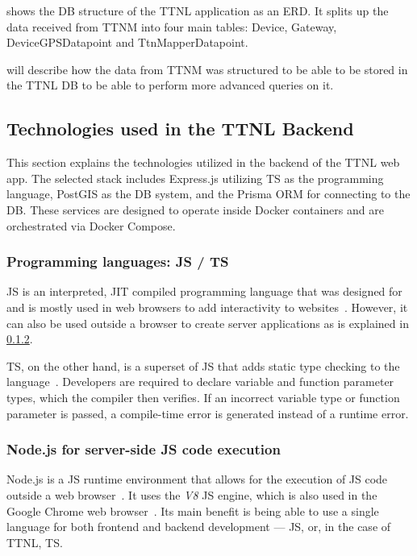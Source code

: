  shows the \ac{DB} structure of the \ac{TTNL} application as an \ac{ERD}.
It splits up the data received from \ac{TTNM} into four main tables: Device, Gateway, DeviceGPSDatapoint and TtnMapperDatapoint.

 will describe how the data from \ac{TTNM} was structured to be able to be stored in the \ac{TTNL} \ac{DB} to be able to perform more advanced queries on it.

\subsection{Technologies used in the \acl{TTNL} Backend}

This section explains the technologies utilized in the backend of the \ac{TTNL} web app.
The selected stack includes Express.js utilizing \ac{TS} as the programming language, PostGIS as the \ac{DB} system, and the Prisma \ac{ORM} for connecting to the \ac{DB}.
These services are designed to operate inside Docker containers and are orchestrated via Docker Compose.

\subsubsection{Programming languages: \acl{JS} / \acl{TS}}

\ac{JS} is an interpreted, \ac{JIT} compiled programming language that was designed for and is mostly used in web browsers to add interactivity to websites~\cite{mdn_javascript_2023}.
However, it can also be used outside a browser to create server applications as is explained in \cref{sec:nodejs}.

\ac{TS}, on the other hand, is a superset of \ac{JS} that adds static type checking to the language~\cite{microsoft_javascript_nodate}.
Developers are required to declare variable and function parameter types, which the compiler then verifies.
If an incorrect variable type or function parameter is passed, a compile-time error is generated instead of a runtime error.

\subsubsection{Node.js for server-side \acl{JS} code execution}\label{sec:nodejs}

Node.js is a \ac{JS} runtime environment that allows for the execution of \ac{JS} code outside a web browser~\cite{openjs_foundation_nodejs_nodate}.
It uses the \emph{V8} \ac{JS} engine, which is also used in the Google Chrome web browser~\cite{google_llc_v8_nodate}.
Its main benefit is being able to use a single language for both frontend and backend development --- \ac{JS}, or, in the case of \ac{TTNL}, \ac{TS}.

